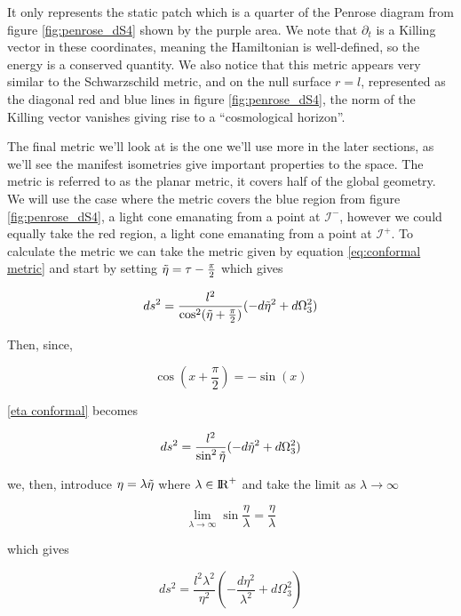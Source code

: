 \documentclass[a4paper,11pt]{article}
\numberwithin{equation}{section}
\numberwithin{figure}{section}
\begin{document}
\begin{large}
It only represents the static patch which is a quarter of the Penrose diagram from figure \ref{fig:penrose_dS4} shown by the purple area. We note that $\partial_t$ is a Killing vector in these coordinates, meaning the Hamiltonian is well-defined, so the energy is a conserved quantity. We also notice that this metric appears very similar to the Schwarzschild metric, and on the null surface $r=l$, represented as the diagonal red and blue lines in figure \ref{fig:penrose_dS4}, the norm of the Killing vector vanishes giving rise to a ``cosmological horizon''.
\newline

The final metric we'll look at is the one we'll use more in the later sections, as we'll see the manifest isometries give important properties to the space. The metric is referred to as the planar metric, it covers half of the global geometry. We will use the case where the metric covers the blue region from figure \ref{fig:penrose_dS4}, a light cone emanating from a point at $\mathcal{I}^-$, however we could equally take the red region, a light cone emanating from  a point at $\mathcal{I}^+$. To calculate the metric we can take the metric given by equation \ref{eq:conformal metric} and start by setting $\Tilde{\eta} = \tau -\frac{\pi}{2}$ which gives

\begin{equation}
\label{eta conformal}
    ds^2=\frac{l^2}{\cos^2(\Tilde{\eta}+\frac{\pi}{2})}(-d\Tilde{\eta}^2+d\Omega^2_3)
\end{equation}

Then, since,

$$\cos(x+\frac{\pi}{2})=-\sin(x)$$

\ref{eta conformal} becomes

\begin{equation}
\label{eta conformal2}
    ds^2=\frac{l^2}{\sin^2\Tilde{\eta}}(-d\Tilde{\eta}^2+d\Omega^2_3)
\end{equation}

we, then, introduce $\eta=\lambda\Tilde{\eta}$ where $\lambda \in {\rm I\!R}^+$ and take the limit as $\lambda \rightarrow \infty$

$$\lim_{\lambda\rightarrow\infty}\sin\frac{\eta}{\lambda}=\frac{\eta}{\lambda}$$


which gives

\begin{equation}
\label{planar metric1}    
    ds^2=\frac{l^2 \lambda^2}{\eta^2}\left(-\frac{d\eta^2}{\lambda^2}+d\Omega^2_3 \right)
\end{equation}



\end{large}
\end{document}
